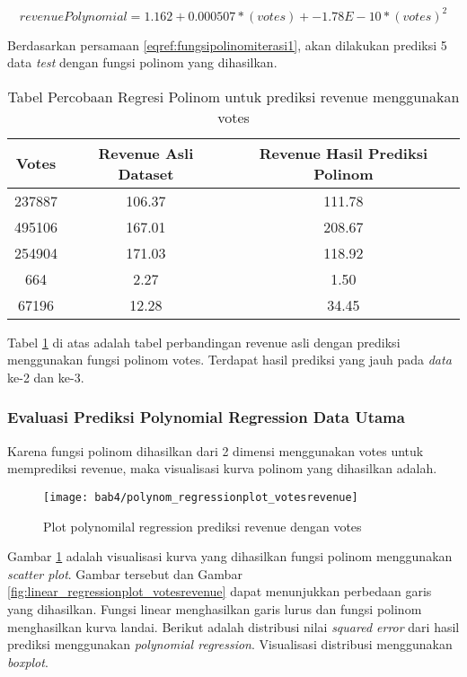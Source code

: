 \begin{equation}
revenuePolynomial = 1.162 + 0.000507*(votes) + -1.78E-10*(votes)^2
\label{eqref:fungsipolinomiterasi1}
\end{equation}


Berdasarkan persamaan \ref{eqref:fungsipolinomiterasi1}, akan dilakukan prediksi 5 data \textit{test} dengan fungsi polinom yang dihasilkan. 


\begin{table}[H]
\caption{Tabel Percobaan Regresi Polinom untuk prediksi revenue menggunakan votes}
\centering
\begin{tabular}{|c|c|c|}
\hline 
Votes & Revenue Asli Dataset & Revenue Hasil Prediksi Polinom \\ 
\hline 
237887 & 106.37 & 111.78 \\ 
\hline 
495106 & 167.01 & 208.67 \\ 
\hline 
254904 & 171.03 & 118.92 \\ 
\hline 
664 & 2.27 & 1.50 \\ 
\hline 
67196 & 12.28 & 34.45 \\ 
\hline 
\end{tabular} 
\label{tab:tabelregresi5polinomiterasi1}
\end{table}

Tabel \ref{tab:tabelregresi5polinomiterasi1} di atas adalah tabel perbandingan revenue asli dengan prediksi menggunakan fungsi polinom votes. Terdapat hasil prediksi yang jauh pada \textit{data} ke-2 dan ke-3. 

\subsubsection{Evaluasi Prediksi Polynomial Regression Data Utama}
Karena fungsi polinom dihasilkan dari 2 dimensi menggunakan votes untuk memprediksi revenue, maka visualisasi kurva polinom yang dihasilkan adalah. 



\begin{figure}[H]
	\centering  
	\texttt{[image: bab4/polynom\_regressionplot\_votesrevenue]}   
	\caption{Plot polynomilal regression prediksi revenue dengan votes}
	\label{fig:polynom_regressionplot_votesrevenue} 
\end{figure} 


Gambar \ref{fig:polynom_regressionplot_votesrevenue} adalah visualisasi kurva yang dihasilkan fungsi polinom menggunakan \textit{scatter plot}. Gambar tersebut dan Gambar \ref{fig:linear_regressionplot_votesrevenue} dapat menunjukkan perbedaan garis yang dihasilkan. Fungsi linear menghasilkan  garis lurus dan fungsi polinom menghasilkan kurva landai. Berikut adalah distribusi nilai \textit{squared error} dari hasil prediksi menggunakan \textit{polynomial regression}. Visualisasi distribusi menggunakan \textit{boxplot}. 




